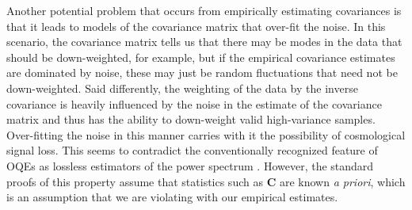 \documentclass[twocolumn,numberedappendix]{emulateapj} \shorttitle{New Limits on the 21 cm Power Spectrum at $z=8.4$}
\begin{document}
Another potential problem that occurs from empirically estimating covariances is that it
leads to models of the covariance matrix that over-fit the noise. In this
scenario, the covariance matrix tells us that there may be modes in the data
that should be down-weighted, for example, but if the empirical covariance estimates are dominated
by noise, these may just be random fluctuations that need not be down-weighted. Said differently, the weighting of the data by the inverse
covariance is heavily influenced by the noise in the estimate of the covariance
matrix and thus has the ability to down-weight valid high-variance samples. 
Over-fitting the noise in this manner carries with it the possibility of cosmological signal loss.
This seems to contradict the conventionally recognized feature of OQEs as
lossless estimators of the power spectrum \citep{tegmark1997}. However,
the standard proofs of this property assume that statistics such as $\mathbf{C}$
are known \emph{a priori}, which is an assumption that we are violating with our
empirical estimates.
%
%


\end{document}
